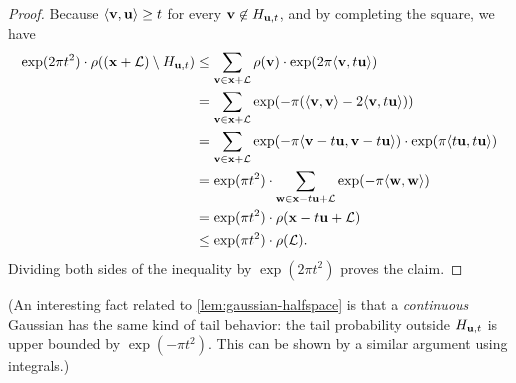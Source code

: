 \documentclass[11pt]{article}
\begin{document}
\begin{proof}
  Because $\langle\mathbf{v}, \mathbf{u}\rangle \geq t$ for every
  $\mathbf{v} \not\in H_{\mathbf{u},t}$, and by completing the square, we have
  \begin{align*}
    \exp(2 \pi t^{2}) \cdot \rho((\mathbf{x}+\mathcal{L}) \setminus H_{\mathbf{u},t})
    &\leq \sum_{\mathbf{v} \in \mathbf{x}+\mathcal{L}} \rho(\mathbf{v}) \cdot \exp(2\pi
      \langle\mathbf{v}, t\mathbf{u}\rangle) \\
    &= \sum_{\mathbf{v} \in \mathbf{x}+\mathcal{L}} \exp(-\pi (\langle\mathbf{v},\mathbf{v}\rangle -
      2 \langle\mathbf{v}, t\mathbf{u}\rangle)) \\
    &= \sum_{\mathbf{v} \in \mathbf{x}+\mathcal{L}} \exp(-\pi \langle\mathbf{v}-t\mathbf{u},
      \mathbf{v}-t\mathbf{u}\rangle) \cdot \exp(\pi \langle t \mathbf{u}, t \mathbf{u}\rangle) \\
    &= \exp(\pi t^{2}) \cdot \sum_{\mathbf{w} \in \mathbf{x}-t\mathbf{u} + \mathcal{L}}
      \exp(-\pi \langle\mathbf{w},\mathbf{w}\rangle) \\
    &= \exp(\pi t^{2}) \cdot \rho(\mathbf{x}-t\mathbf{u} + \mathcal{L}) \\
    &\leq \exp(\pi t^{2}) \cdot \rho(\mathcal{L}) .
  \end{align*}
  Dividing both sides of the inequality by $\exp(2 \pi t^2)$ proves
  the claim.
\end{proof}

(An interesting fact related to \cref{lem:gaussian-halfspace} is that
a \emph{continuous} Gaussian has the same kind of tail behavior: the
tail probability outside $H_{\mathbf{u},t}$ is upper bounded by
$\exp(-\pi t^2)$. This can be shown by a similar argument using
integrals.)
\end{document}
